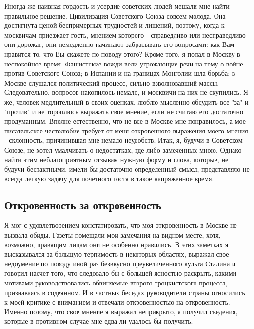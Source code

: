 \documentclass[12pt, a4paper, openany]{book}
\begin{document}
Иногда же наивная гордость и  усердие советских  людей  мешали мне найти  правильное  решение. Цивилизация   Советского   Союза  совсем   молода.   Она   достигнута  ценой беспримерных  трудностей и лишений,  поэтому, когда  к  москвичам  приезжает гость, мнением  которого - справедливо или несправедливо  - они дорожат, они немедленно начинают забрасывать его вопросами:  как  Вам нравится то, что Вы скажете по поводу этого? Кроме того, я попал в Москву  в  неспокойное время. Фашистские  вожди вели угрожающие  речи на тему  о  войне против  Советского Союза;  в  Испании  и  на  границах Монголии  шла борьба; в  Москве слушался политический  процесс, сильно взволновавший  массы.  Следовательно, вопросов накопилось  немало,  и   москвичи  на   них  не  скупились.  Я  же,  человек медлительный в  своих оценках, люблю мысленно обсудить все "за" и "против" и не  тороплюсь   выражать  свое  мнение,  если  не   считаю   его  достаточно продуманным. Вполне естественно, что не все в Москве мне понравилось, а  мое писательское честолюбие требует от меня откровенного выражения моего  мнения - склонность, причинившая мне немало неудобств. Итак, я, будучи в  Советском Союзе, не хотел умалчивать  о недостатках, где-либо замеченных мною.  Однако найти этим неблагоприятным отзывам нужную форму  и слова, которые, не будучи бестактными, имели бы достаточно определенный смысл, представляло  не всегда легкую задачу для почетного гостя в такое напряженное время.

\subsection*{Откровенность за откровенность}

Я мог с удовлетворением констатировать, что  моя откровенность  в  Москве  не  вызвала  обиды. Газеты  помещали  мои замечания на видном  месте, хотя, возможно,  правящим лицам  они не особенно нравились. В этих заметках я  высказывался за большую терпимость в некоторых областях,   выражал   свое  недоумение   по   поводу   иной  раз   безвкусно преувеличенного культа Сталина  и говорил насчет  того, что  следовало  бы с большей  ясностью  раскрыть,  какими  мотивами  руководствовались обвиняемые второго троцкистского процесса, признаваясь в содеянном. И в частных беседах руководители  страны  относились  к  моей  критике с  вниманием  и  отвечали откровенностью  на откровенность. Именно  потому, что свое мнение я  выражал неприкрыто,  я  получил  сведения, которые  в противном случае мне  едва  ли удалось бы получить.
\end{document}

